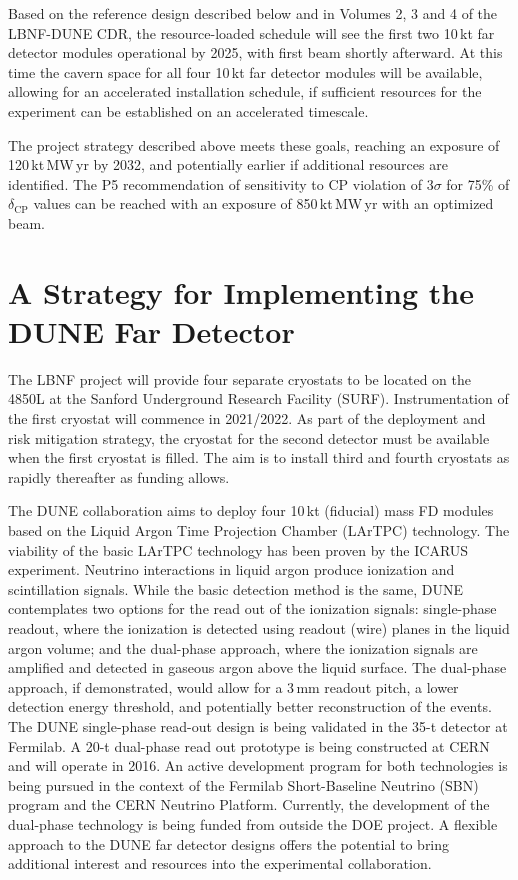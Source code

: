 Based on the reference design described below and in Volumes 2, 3 and 4 of the LBNF-DUNE 
CDR, the resource-loaded schedule will see the first two 10\,kt far detector modules 
operational by 2025, with first beam shortly afterward. At this time the cavern 
space for all four 10\,kt far detector modules will be available, allowing for 
an accelerated installation schedule, if sufficient resources for
the experiment can be established on an accelerated timescale.  

\vspace{6pt}
The project strategy described above meets these goals, reaching an exposure of 
120\,kt\,MW\,yr by 2032, and potentially earlier if additional resources are identified. 
The P5 recommendation of sensitivity to CP violation of 3$\sigma$ for 75\% of $\delta_\text{CP}$
values can be reached with an exposure of 850\,kt\,MW\,yr with an optimized beam.

\section{A Strategy for Implementing the DUNE Far Detector}

The LBNF project will provide four separate cryostats to be located on the 4850L at the 
Sanford Underground Research Facility (SURF).  Instrumentation of the first cryostat 
will commence in 2021/2022. As part of the deployment and risk mitigation strategy, 
the cryostat for the second detector must be available when the first cryostat 
is filled. The aim is to install third and fourth cryostats as rapidly thereafter as funding 
allows.

The DUNE collaboration aims to deploy four 10\,kt (fiducial) mass FD modules based 
on the Liquid Argon Time Projection Chamber (LArTPC) technology. The viability 
of the basic LArTPC technology has been proven by the ICARUS experiment. Neutrino 
interactions in liquid argon produce ionization and scintillation signals. While 
the basic detection method is the same, DUNE contemplates two options for the read 
out of the ionization signals: single-phase readout, where the ionization is detected 
using readout (wire) planes in the liquid argon volume; and the dual-phase approach, where 
the ionization signals are amplified and detected in gaseous argon above the liquid 
surface. The dual-phase approach, if demonstrated, would allow for a 3\,mm readout 
pitch, a lower detection energy threshold, and potentially better reconstruction of 
the events. The DUNE single-phase read-out design is being validated 
in the 35-t detector at Fermilab. A 20-t dual-phase read out prototype is being 
constructed at CERN and will operate in 2016. An active development program for 
both technologies is being pursued in the context of the Fermilab Short-Baseline Neutrino (SBN)
program and 
the CERN Neutrino Platform. Currently, the development of the dual-phase technology 
is being funded from outside the DOE project.
A flexible 
approach to the DUNE far detector designs offers the potential to bring additional 
interest and resources into the experimental collaboration. 

